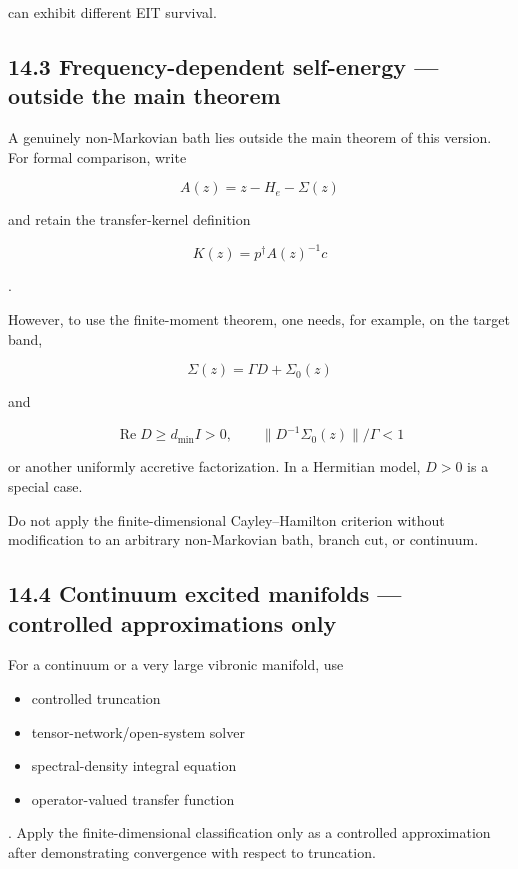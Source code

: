 \documentclass[
  10pt,
  a4paper,
]{article}
\providecommand{\tightlist}{%
  \setlength{\itemsep}{0pt}\setlength{\parskip}{0pt}}
\begin{document}
can exhibit different EIT survival.

\subsection{14.3 Frequency-dependent self-energy --- outside the main
theorem}\label{frequency-dependent-self-energy-outside-the-main-theorem}

A genuinely non-Markovian bath lies outside the main theorem of this
version. For formal comparison, write

\[
A(z)=z-H_e-\Sigma(z)
\]

and retain the transfer-kernel definition

\[
K(z)=p^\dagger A(z)^{-1}c
\]

.

However, to use the finite-moment theorem, one needs, for example, on
the target band,

\[
\Sigma(z)=\Gamma D+\Sigma_0(z)
\]

and

\[
\operatorname{Re}D\ge d_{\min}I>0,
\qquad
\|D^{-1}\Sigma_0(z)\|/\Gamma<1
\]

or another uniformly accretive factorization. In a Hermitian model,
\(D>0\) is a special case.

Do not apply the finite-dimensional Cayley--Hamilton criterion without
modification to an arbitrary non-Markovian bath, branch cut, or
continuum.

\subsection{14.4 Continuum excited manifolds --- controlled
approximations
only}\label{continuum-excited-manifolds-controlled-approximations-only}

For a continuum or a very large vibronic manifold, use

\begin{itemize}
\tightlist
\item
  controlled truncation
\item
  tensor-network/open-system solver
\item
  spectral-density integral equation
\item
  operator-valued transfer function
\end{itemize}

. Apply the finite-dimensional classification only as a controlled
approximation after demonstrating convergence with respect to
truncation.
\end{document}
